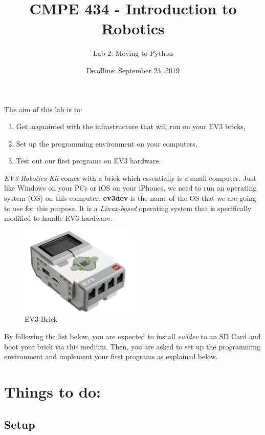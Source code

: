 \documentclass{scrartcl}
\title{CMPE 434 - Introduction to Robotics}
\subtitle{Lab 2: Moving to Python}
\date{Deadline: September 23, 2019}
\begin{document}
\maketitle

The aim of this lab is to:
\begin{enumerate}
    \item Get acquainted with the infrastructure that will run on your EV3 bricks,
    \item Set up the programming environment on your computers,
    \item Test out our first programs on EV3 hardware.
\end{enumerate} 

\textit{EV3 Robotics Kit} comes with a brick which essentially is a small computer. Just like Windows on your PCs or iOS on your iPhones, we need to run an operating system (OS) on this computer. \textbf{ev3dev} is the name of the OS that we are going to use for this purpose. It is a \textit{Linux-based} operating system that is specifically modified to handle EV3 hardware.
\\

\begin{figure}[h!]
    \begin{center}
        \includegraphics[width=0.5\textwidth]{brick.jpg}
        \caption{EV3 Brick}
    \end{center}
\end{figure}

By following the list below, you are expected to install \textit{ev3dev} to an SD Card and boot your brick via this medium. Then, you are asked to set up the programming environment and implement your first programs as explained below.

\newpage
\section{Things to do:}
\subsection{Setup}
\end{document}
